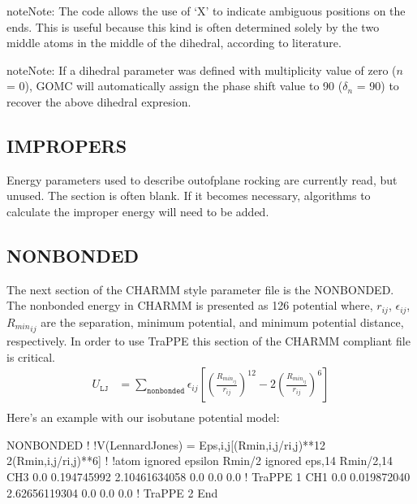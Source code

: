 \documentclass[letterpaper,10pt,english]{sphinxmanual}
\begin{document}
\begin{sphinxadmonition}{note}{Note:}
\sphinxAtStartPar
The code allows the use of ‘X’ to indicate ambiguous positions on the ends. This is useful because this kind is often determined solely by the two middle atoms in the middle of the dihedral, according to literature.
\end{sphinxadmonition}

\begin{sphinxadmonition}{note}{Note:}
\sphinxAtStartPar
If a dihedral parameter was defined with multiplicity value of zero (\(n\) = 0), GOMC will automatically assign the phase shift value to 90 (\(\delta_n\) = 90) to recover the above dihedral expresion.
\end{sphinxadmonition}


\subsection{IMPROPERS}
\label{\detokenize{input_file:impropers}}
\sphinxAtStartPar
Energy parameters used to describe out\sphinxhyphen{}of\sphinxhyphen{}plane rocking are currently read, but unused. The section is often blank. If it becomes necessary, algorithms to calculate the improper energy will need to be added.


\subsection{NONBONDED}
\label{\detokenize{input_file:nonbonded}}
\sphinxAtStartPar
The next section of the CHARMM style parameter file is the NONBONDED. The nonbonded energy in CHARMM is presented as 12\sphinxhyphen{}6 potential
where, \(r_{ij}\), \(\epsilon_{ij}\), \({R_{min}}_{ij}\) are the separation, minimum potential, and minimum potential distance, respectively.
In order to use TraPPE this section of the CHARMM compliant file is critical.
\begin{equation*}
\begin{split}U_{\texttt{LJ}}&=\sum_{\texttt{nonbonded}} \epsilon_{ij}\left[\left(\frac{R_{min_{ij}}}{r_{ij}}\right)^{12}-2\left(\frac{R_{min_{ij}}}{r_{ij}}\right)^6\right] \\\end{split}
\end{equation*}
\sphinxAtStartPar
Here’s an example with our isobutane potential model:

\begin{sphinxVerbatim}[commandchars=\\\{\}]
NONBONDED
!
!V(Lennard\PYGZhy{}Jones) = Eps,i,j[(Rmin,i,j/ri,j)**12 \PYGZhy{} 2(Rmin,i,j/ri,j)**6]
!
!atom ignored epsilon         Rmin/2        ignored   eps,1\PYGZhy{}4     Rmin/2,1\PYGZhy{}4
CH3   0.0     \PYGZhy{}0.194745992  2.10461634058     0.0       0.0       0.0 !  TraPPE 1
CH1   0.0     \PYGZhy{}0.019872040  2.62656119304     0.0       0.0       0.0 !  TraPPE 2
End
\end{sphinxVerbatim}
\end{document}
